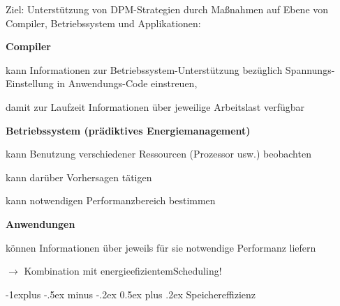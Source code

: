 \documentclass[a4paper]{article}
\makeatletter
\renewcommand{\subsection}{\@startsection{subsection}{2}{0mm}%
 {-1explus -.5ex minus -.2ex}%
 {0.5ex plus .2ex}%
 {\normalfont\normalsize\bfseries}}
\makeatother
\begin{document}
\begin{multicols}{3}
    \begin{itemize*}
        \item
        Ziel: Unterstützung von DPM-Strategien durch Maßnahmen auf Ebene von
        Compiler, Betriebssystem und Applikationen:
        \begin{itemize*}
            \item \textbf{Compiler} \begin{itemize*} \item   kann Informationen zur Betriebssystem-Unterstützung bezüglich   Spannungs-Einstellung in Anwendungs-Code einstreuen, \item   damit zur Laufzeit Informationen über jeweilige Arbeitslast   verfügbar \end{itemize*}
        \end{itemize*}
        \item
        \textbf{Betriebssystem (prädiktives Energiemanagement)}
        \begin{itemize*}
            \item kann Benutzung verschiedener Ressourcen (Prozessor usw.) beobachten
            \item kann darüber Vorhersagen tätigen
            \item kann notwendigen Performanzbereich bestimmen
        \end{itemize*}
        \item
        \textbf{Anwendungen}
        \begin{itemize*}
            \item können Informationen über jeweils für sie notwendige Performanz liefern
        \end{itemize*}
        \item
        $\rightarrow$  Kombination mit
        energieefizientemScheduling!
    \end{itemize*}


    \subsection{Speichereffizienz}


\end{multicols}
\end{document}
